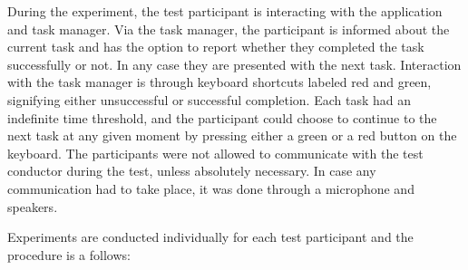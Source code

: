 During the experiment, the test participant is interacting with the application and task manager. Via the task manager,
the participant is informed about the current task and has the option to report whether they completed the task
successfully or not. In any case they are presented with the next task.  Interaction with the task manager is through
keyboard shortcuts labeled red and green, signifying either unsuccessful or successful completion.  Each task had an
indefinite time threshold, and the participant could choose to continue to the next task at any given moment by pressing
either a green or a red button on the keyboard.  The participants were not allowed to communicate with the test
conductor during the test, unless absolutely necessary.  In case any communication had to take place, it was done
through a microphone and speakers.

Experiments are conducted individually for each test participant and the procedure is a follows:

